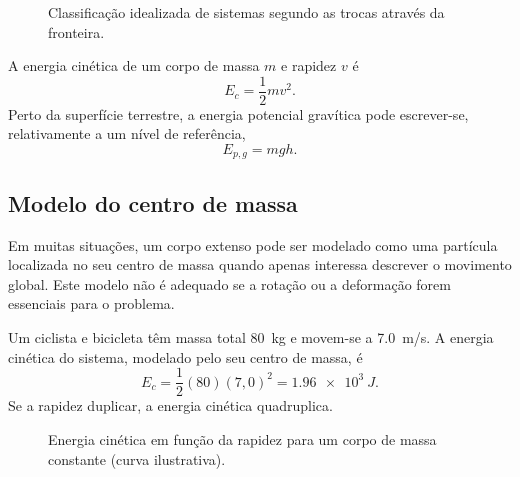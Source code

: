 \documentclass[11pt,a4paper,oneside]{book}
\begin{document}
\begin{figure}[H]
\centering
{}
\caption{Classificação idealizada de sistemas segundo as trocas através da fronteira.}
\end{figure}

A energia cinética de um corpo de massa $m$ e rapidez $v$ é
\[
E_c=\frac12 mv^2.
\]
Perto da superfície terrestre, a energia potencial gravítica pode escrever-se, relativamente a um nível de referência,
\[
E_{p,g}=mgh.
\]

\subsection*{Modelo do centro de massa}
Em muitas situações, um corpo extenso pode ser modelado como uma partícula localizada no seu centro de massa quando apenas interessa descrever o movimento global. Este modelo não é adequado se a rotação ou a deformação forem essenciais para o problema.

\begin{exemplo}[title=Exemplo resolvido -- energia cinética]
Um ciclista e bicicleta têm massa total \SI{80}{kg} e movem-se a \SI{7.0}{m/s}. A energia cinética do sistema, modelado pelo seu centro de massa, é
\[
E_c=\frac12(80)(7{,}0)^2=\SI{1.96e3}{J}.
\]
Se a rapidez duplicar, a energia cinética quadruplica.
\end{exemplo}

\begin{figure}[H]
\centering
{}
\caption{Energia cinética em função da rapidez para um corpo de massa constante (curva ilustrativa).}
\end{figure}
\end{document}
